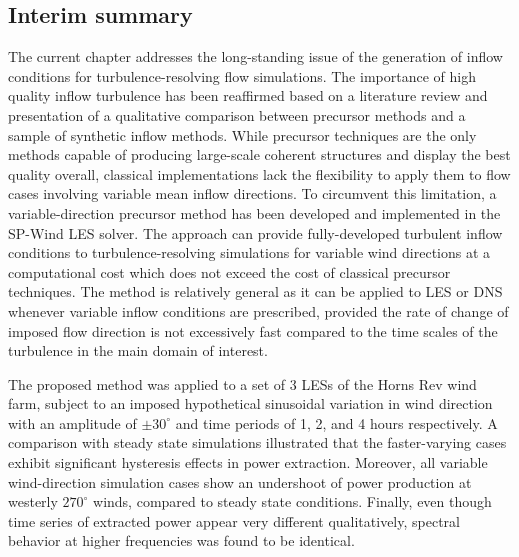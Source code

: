 	\subsection{Interim summary}
	The current chapter addresses the long-standing issue of the generation of inflow conditions for turbulence-resolving flow simulations.
	The importance of high quality inflow turbulence has been reaffirmed based on a literature review and presentation of a qualitative comparison
	between precursor methods and a sample of synthetic inflow methods.  While precursor techniques are the only methods capable of producing
	large-scale coherent structures and display the best quality overall, classical implementations lack the flexibility to apply them to flow
	cases involving variable mean inflow directions. To circumvent this limitation, a variable-direction precursor method has been developed and
	implemented in the SP-Wind LES solver. The approach can provide fully-developed turbulent inflow conditions to turbulence-resolving
	simulations  for variable wind directions at a computational cost which does not exceed the cost of classical precursor techniques.  The
	method is relatively general as it can be applied to LES or DNS whenever variable inflow conditions are prescribed, provided the rate of change of imposed flow direction is not excessively fast compared to the time scales of the turbulence in the main domain of interest.
	
	The proposed method was applied to a set of 3 LESs of the Horns Rev wind farm, subject to an imposed hypothetical sinusoidal variation in wind direction with an amplitude of $\pm 30^\circ$ and time periods of 1, 2, and 4 hours respectively. A comparison with steady state simulations illustrated that the faster-varying cases exhibit significant hysteresis effects in power extraction. Moreover, all variable wind-direction simulation cases show an undershoot of power production at westerly $270^\circ$ winds, compared to steady state conditions. Finally, even though time series of extracted power appear very different qualitatively, spectral behavior at higher frequencies was found to be identical.

	\clearpage
	
